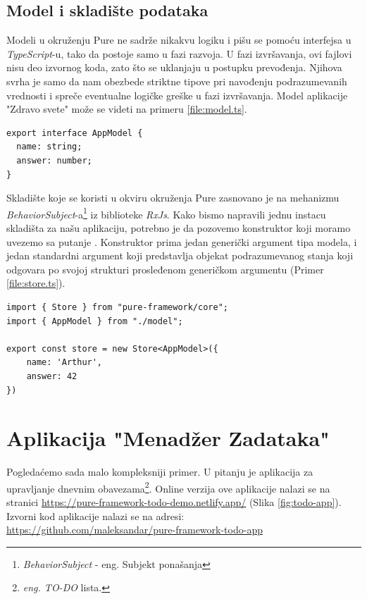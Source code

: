\documentclass[12pt,oneside]{memoir}
\newcommand{\code}[1]{\colorbox{codegray}{\texttt{\scalebox{0.9}{#1}}}}%
\begin{document}
\subsection{Model i skladište podataka}
Modeli u okruženju Pure ne sadrže nikakvu logiku i pišu se pomoću interfejsa u \emph{TypeScript}-u, tako da postoje samo u fazi razvoja.
U fazi izvršavanja, ovi fajlovi nisu deo izvornog koda, zato što se uklanjaju u postupku prevođenja.
Njihova svrha je samo da nam obezbede striktne tipove pri navođenju podrazumevanih vrednosti i spreče eventualne logičke greške u fazi izvršavanja.
Model aplikacije "Zdravo svete" može se videti na primeru \ref{file:model.ts}.
\begin{lstlisting}[style=jsStyle, caption={Fajl \code{src/model.ts}},label=file:model.ts]
export interface AppModel {
  name: string;
  answer: number;
} 
\end{lstlisting}
Skladište koje se koristi u okviru okruženja Pure zasnovano je na mehanizmu
\emph{BehaviorSubject}-a\footnote{\emph{BehaviorSubject} - eng. Subjekt ponašanja} iz biblioteke \emph{RxJs}. 
Kako bismo napravili jednu instacu skladišta za našu aplikaciju, potrebno je da pozovemo konstruktor \code{Store<T>}
koji moramo uvezemo sa putanje \code{"pure-framework/core"}. Konstruktor \code{Store<T>} prima jedan generički argument tipa modela,
i jedan standardni argument koji predstavlja objekat podrazumevanog stanja koji odgovara po svojoj strukturi prosleđenom generičkom argumentu (Primer \ref{file:store.ts}).

\begin{lstlisting}[style=jsStyle, caption={Fajl \code{src/store.ts}},label=file:store.ts]
import { Store } from "pure-framework/core";
import { AppModel } from "./model";

export const store = new Store<AppModel>({
    name: 'Arthur',
    answer: 42
})
\end{lstlisting}
\section{Aplikacija "Menadžer Zadataka"}
Pogledaćemo sada malo kompleksniji primer.
U pitanju je aplikacija za upravljanje dnevnim obavezama\footnote{\emph{eng. TO-DO} lista.}.
Online verzija ove aplikacije nalazi se na stranici
\url{https://pure-framework-todo-demo.netlify.app/} (Slika \ref{fig:todo-app}).
Izvorni kod aplikacije nalazi se na adresi: 
\\\url{https://github.com/maleksandar/pure-framework-todo-app}
\end{document}
